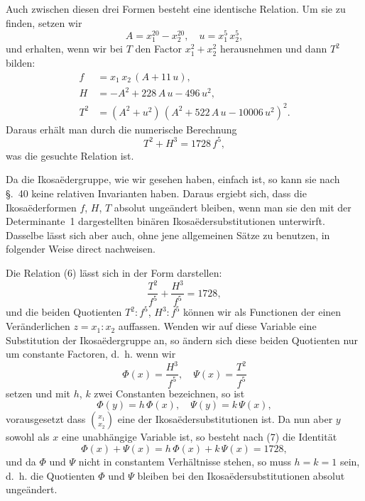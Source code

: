 \documentclass[12pt,a4paper]{article}
\begin{document}
Auch zwischen diesen drei Formen besteht eine identische Relation. Um sie zu finden, setzen wir
\[
A = x_{1}^{20} - x_{2}^{20},\quad u = x_{1}^{5}\,x_{2}^{5},
\]
und erhalten, wenn wir bei $T$ den Factor $x_{1}^{2} + x_{2}^{2}$ herausnehmen und dann $T^{2}$ bilden:
\[
\begin{aligned}
f &= x_{1}\,x_{2}\,(A + 11\,u),\\
H &= -A^{2} + 228\,A\,u - 496\,u^{2},\\
T^{2} &= (A^{2} + u^{2})\,(A^{2} + 522\,A\,u - 10006\,u^{2})^{2}.
\end{aligned}
\]
Daraus erhält man durch die numerische Berechnung
\begin{equation}\label{eq:60.6}
\tag{6}
T^{2} + H^{3} = 1728\,f^{5},
\end{equation}
was die gesuchte Relation ist.

Da die Ikosaëdergruppe, wie wir gesehen haben, einfach ist, so kann sie nach \S.~40 keine relativen Invarianten haben. Daraus ergiebt sich, dass die Ikosaëderformen $f$, $H$, $T$ absolut ungeändert bleiben, wenn man sie den mit der Determinante~1 dargestellten binären Ikosaëdersubstitutionen unterwirft. Dasselbe lässt sich aber auch, ohne jene allgemeinen Sätze zu benutzen, in folgender Weise direct nachweisen.

Die Relation (6) lässt sich in der Form darstellen:
\begin{equation}\label{eq:60.7}
\tag{7}
\frac{T^{2}}{f^{5}} + \frac{H^{3}}{f^{5}} = 1728,
\end{equation}
und die beiden Quotienten $T^{2}\!:f^{5}$, $H^{3}\!:f^{5}$ können wir als Functionen der einen Veränderlichen $z = x_{1}\!:x_{2}$ auffassen. Wenden wir auf diese Variable eine Substitution der Ikosaëdergruppe an, so ändern sich diese beiden Quotienten nur um constante Factoren, d.~h. wenn wir
\begin{equation}\label{eq:60.8}
\tag{8}
\Phi(x) = \frac{H^{3}}{f^{5}},\quad \Psi(x) = \frac{T^{2}}{f^{5}}
\end{equation}
setzen und mit $h$, $k$ zwei Constanten bezeichnen, so ist
\[
\Phi(y) = h\,\Phi(x),\quad \Psi(y) = k\,\Psi(x),
\]
vorausgesetzt dass $\binom{x_{1}}{x_{2}}$ eine der Ikosaëdersubstitutionen ist. Da nun aber $y$ sowohl als $x$ eine unabhängige Variable ist, so besteht nach (7) die Identität
\[
\Phi(x) + \Psi(x) = h\,\Phi(x) + k\,\Psi(x) = 1728,
\]
und da $\Phi$ und $\Psi$ nicht in constantem Verhältnisse stehen, so muss $h = k = 1$ sein, d.~h. die Quotienten $\Phi$ und $\Psi$ bleiben bei den Ikosaëdersubstitutionen absolut ungeändert.
\end{document}
